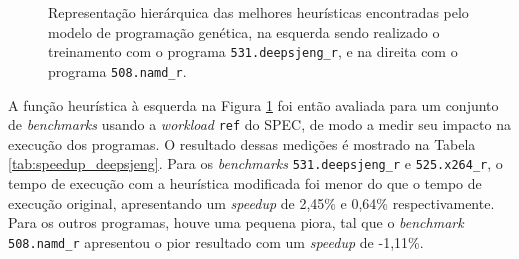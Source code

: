 \documentclass[
	12pt,				%
	openright,			%
	twoside,			%
	a4paper,			%
	tcc,			%
	]{ABNT-DC-UEL}
\begin{document}
\begin{figure}
    \centering
    \begin{subfigure}{0.495\textwidth}
        \centering
    \end{subfigure}
    \begin{subfigure}{0.495\textwidth}
        \centering
    \end{subfigure}
    \caption{Representação hierárquica das melhores heurísticas encontradas pelo modelo de programação genética, na esquerda sendo realizado o treinamento com o programa \texttt{531.deepsjeng\_r}, e na direita com o programa \texttt{508.namd\_r}.}
    \label{fig:melhor-heuristica-deepsjeng}
\end{figure}

A função heurística à esquerda na Figura \ref{fig:melhor-heuristica-deepsjeng} foi então avaliada para um conjunto de \textit{benchmarks} usando a \textit{workload} \texttt{ref} do SPEC, de modo a medir seu impacto na execução dos programas. O resultado dessas medições é mostrado na Tabela \ref{tab:speedup_deepsjeng}. Para os \textit{benchmarks} \texttt{531.deepsjeng\_r} e \texttt{525.x264\_r}, o tempo de execução com a heurística modificada foi menor do que o tempo de execução original, apresentando um \textit{speedup} de 2,45\% e 0,64\% respectivamente. Para os outros programas, houve uma pequena piora, tal que o \textit{benchmark} \texttt{508.namd\_r} apresentou o pior resultado com um \textit{speedup} de -1,11\%.
\end{document}
